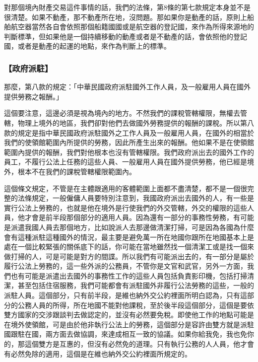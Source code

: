 \documentclass[oneside,sub3section]{ctexbook}
\begin{document}
對那個境內財產交易這件事情的話，我們的法條，第8條的第七款規定本身並不是很清楚。如果不動產，那不動產所在地，沒問題。那如果你是動產的話，原則上船舶航空器當然各自會依照那個船籍國國或是航空器的登記國，來作為所得來源地的判斷標準，但如果他是一個持續移動的動產或者是不動產的話，會依照他的登記國，或者是動產的起運的地點，來作為判斷上的標準。

\hypertarget{ux653fux5e9cux6d3eux99d0}{%
\subsubsection{【政府派駐】}\label{ux653fux5e9cux6d3eux99d0}}

那麼，第八款的規定：「中華民國政府派駐國外工作人員，及一般雇用人員在國外提供勞務之報酬。」

這個要注意，這邊必須是視為境內的地方。不然我們的課稅管轄權限，無權去管轄，物理上境外的地區，我們卻對他們去做國外勞務提供的報酬的課稅。所以第八款的規定是指中華民國政府派駐國外之工作人員及一般雇用人員，在國外的相當於我們的使領館範圍內所提供的勞務，因此所產生出來的報酬。他如果不是在使領館範圍內提供的報酬，我們對他根本也沒有管轄權限。我們政府派出去的國外工作的員工，不履行公法上任務的這些人員、一般雇用人員在國外提供勞務，他已經是境外，根本不在我們的課稅管轄權限範圍內。

這個條文規定，不管是在主體跟適用的客體範圍上面都不盡清楚，都不是一個很完整的法條規定，一般僱傭人員要特別注意到，我國政府派出去國外的人，有一些是實行公法上勞務的，也就是他在境外是行使我們的外交管轄，外交的權限的這些人員，他才會是前半段那個部分的適用人員。因為還有一部分的事務性勞務，有可能是派遣我國人員去那個地方，比如說派人去那邊做清潔打掃，可是因為各國為什麼會有這種派駐這種國外的情況，最主要是避免萬一所在地國你跟所在地國基本上是處在一個比較緊張的關係底下的話，你可能在當地雖然找一個清潔工或是找一個來做打掃的人，可是可能是對方的間諜。所以我們有可能派出去的，有一部分是屬於履行公法上勞務的，這一些外派的公務員，不管你是文官和武官，另外一方面，我們也有可能是派遣出去國外的事務性工作的這些人員包括負責影印機，包括打掃清潔，甚至包括住宿服務，我們可能都會有派駐國外非履行公法勞務的這些，一般的派駐人員。這個部分，只有前半段，是維也納外交公約裡面所明白認為，只有這部分的公務人員的所得，所在地國不能對他課稅，至於後半段這個部分，這個是要依雙方國家的交涉跟談判去做認定的，並沒有必然要免稅。即使他工作的地點可能是在境外使領館，可是由於他非執行公法上的勞務，這個部分是容許由雙方就是派駐國跟駐在國，兩方面去做協調，來達成相互一致的協議。如果你給我免，我也免你的，那這個雙方是互惠的，但沒有必然免的道理。只有執行公務的人人員，他才會有必然免除的適用，這個是在維也納外交公約裡面所規定的。
\end{document}
